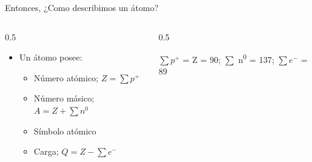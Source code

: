 \documentclass[11pt, aspectratio=169, xcolor=table]{beamer}
\begin{document}
\begin{frame}[label={sec:orgf9efcc4}]{Entonces, ¿Como describimos un átomo?}
  \begin{columns}
    \begin{column}{0.5\columnwidth}
      \begin{itemize}[<+->]
        \item Un átomo posee:
              \begin{itemize}
                \item Número atómico; \(Z = \sum p^+\)
                \item Número másico; \(A = Z + \sum n^0\)
                \item Símbolo atómico
                \item Carga; \(Q = Z - \sum e^-\)
              \end{itemize}
      \end{itemize}
    \end{column}
    \begin{column}{0.5\columnwidth}
      \huge
      \centering
      \vspace{1cm}

      \pause

      \small
      \(\sum p^+\) = Z = 90; \(\sum\) n\textsuperscript{0} = 137; \(\sum e^-\) = 89
    \end{column}
  \end{columns}
\end{frame}
\end{document}
